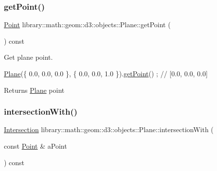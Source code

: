 \subsubsection{\texorpdfstring{get\+Point()}{getPoint()}}
{\footnotesize\ttfamily \hyperlink{classlibrary_1_1math_1_1geom_1_1d3_1_1objects_1_1_point}{Point} library\+::math\+::geom\+::d3\+::objects\+::\+Plane\+::get\+Point (\begin{DoxyParamCaption}{ }\end{DoxyParamCaption}) const}



Get plane point. 


\begin{DoxyCode}
\hyperlink{classlibrary_1_1math_1_1geom_1_1d3_1_1objects_1_1_plane_a81fe78a983e2cb6ee6ad9bfabd22c3a4}{Plane}(\{ 0.0, 0.0, 0.0 \}, \{ 0.0, 0.0, 1.0 \}).\hyperlink{classlibrary_1_1math_1_1geom_1_1d3_1_1objects_1_1_plane_a52f9167ca123019c4b303c19b696b886}{getPoint}() ; \textcolor{comment}{// [0.0, 0.0, 0.0]}
\end{DoxyCode}


\begin{DoxyReturn}{Returns}
\hyperlink{classlibrary_1_1math_1_1geom_1_1d3_1_1objects_1_1_plane}{Plane} point 
\end{DoxyReturn}
\mbox{\label{classlibrary_1_1math_1_1geom_1_1d3_1_1objects_1_1_plane_ada9c15c3d9e0f8090fbe80d8d57232df}} 
\subsubsection{\texorpdfstring{intersection\+With()}{intersectionWith()}\hspace{0.1cm}{\footnotesize\ttfamily [1/5]}}
{\footnotesize\ttfamily \hyperlink{classlibrary_1_1math_1_1geom_1_1d3_1_1_intersection}{Intersection} library\+::math\+::geom\+::d3\+::objects\+::\+Plane\+::intersection\+With (\begin{DoxyParamCaption}\item[{const \hyperlink{classlibrary_1_1math_1_1geom_1_1d3_1_1objects_1_1_point}{Point} \&}]{a\+Point }\end{DoxyParamCaption}) const}



